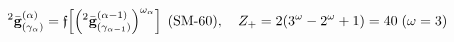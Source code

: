 \documentclass[preview]{standalone}
\begin{document}
\begin{align*}
\special{dvisvgm:raw <g id='unique000'>}{}^2\bar{\mathbf{g}}_{(\gamma_\alpha)}^{(\alpha)} = \mathfrak{f}\!\left[\left({}^2\bar{\mathbf{g}}_{(\gamma_{\alpha-1})}^{(\alpha-1)}\right)^{\omega_\alpha}\right]\;(\text{SM-60}),\quad Z_+ = 2(3^\omega - 2^\omega + 1) = 40\;(\omega=3)\special{dvisvgm:raw </g>}
\end{align*}
\end{document}
